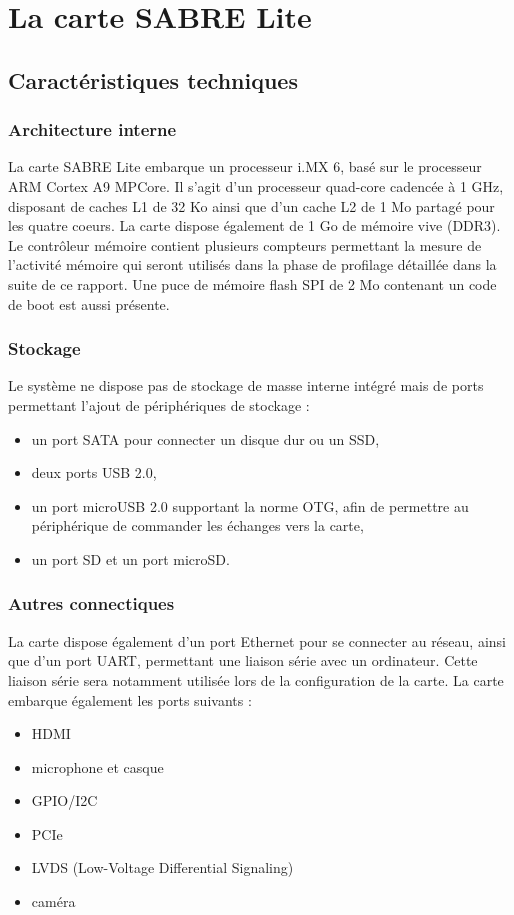 \section{La carte SABRE Lite}

\subsection{Caractéristiques techniques}

\subsubsection{Architecture interne}
La carte SABRE Lite\cite{_i.mx_2014} embarque un processeur i.MX 6, basé sur le processeur ARM
Cortex A9 MPCore. Il s'agit d'un processeur quad-core cadencée à 1 GHz, 
disposant de caches L1 de 32 Ko ainsi que d'un cache L2 de 1 Mo partagé pour les
quatre coeurs. La carte dispose également de 1 Go de mémoire vive (DDR3). Le
contrôleur mémoire contient plusieurs compteurs permettant la mesure de 
l'activité mémoire qui seront utilisés dans la phase de profilage détaillée dans
la suite de ce rapport. Une puce de mémoire flash SPI de 2 Mo contenant un code
de boot est aussi présente.

\subsubsection{Stockage}
Le système ne dispose pas de stockage de masse interne intégré mais de ports
permettant l'ajout de périphériques de stockage :
\begin{itemize}
\renewcommand{\labelitemi}{$\bullet$}
\item un port SATA pour connecter un disque dur ou un SSD,
\item deux ports USB 2.0,
\item un port microUSB 2.0 supportant la norme OTG, afin de permettre au 
  périphérique de commander les échanges vers la carte,
\item un port SD et un port microSD.
\end{itemize}

\subsubsection{Autres connectiques}
La carte dispose également d'un port Ethernet pour se connecter au réseau, ainsi
que d'un port UART, permettant une liaison série avec un ordinateur. Cette
liaison série sera notamment utilisée lors de la configuration de la carte. La
carte embarque également les ports suivants :
\begin{itemize}
\renewcommand{\labelitemi}{$\bullet$}
\item HDMI
\item microphone et casque
\item GPIO/I2C
\item PCIe
\item LVDS (Low-Voltage Differential Signaling)
\item caméra
\end{itemize}

